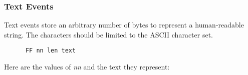 

\subsubsection{Text Events}
\label{subsubsec:midi_meta_text_events}

   Text events store an arbitrary number of bytes to represent a
   human-readable string.
   The characters should be limited to the ASCII character set.

   \begin{verbatim}
      FF nn len text
   \end{verbatim}

   Here are the values of \textsl{nn} and the text they represent:


